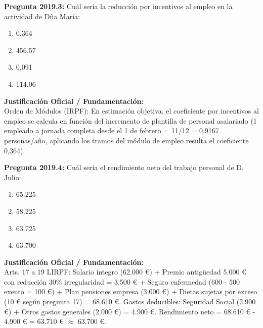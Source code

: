 \documentclass[11pt,a4paper,openany]{article}
\begin{document}
\noindent\textbf{\sffamily Pregunta 2019.3:} Cuál sería la reducción por incentivos al empleo en la actividad de Dña María:\\[0.15cm]
\begin{enumerate}[label=\textbf{\alph*)},leftmargin=1.8em,itemsep=1.5pt,topsep=2pt,partopsep=0pt,parsep=0pt]
    \item 0,364
    \item 456,57
    \item 0,091
    \item 114,06
\end{enumerate}
\begin{solucionBox}
\textbf{Justificación Oficial / Fundamentación:}\\[0.1cm]
Orden de Módulos (IRPF): En estimación objetiva, el coeficiente por incentivos al empleo se calcula en función del incremento de plantilla de personal asalariado (1 empleado a jornada completa desde el 1 de febrero = 11/12 = 0,9167 personas/año, aplicando los tramos del módulo de empleo resulta el coeficiente 0,364).
\end{solucionBox}
\vspace{0.35cm}

\noindent\textbf{\sffamily Pregunta 2019.4:} Cuál sería el rendimiento neto del trabajo personal de D. Julio:\\[0.15cm]
\begin{enumerate}[label=\textbf{\alph*)},leftmargin=1.8em,itemsep=1.5pt,topsep=2pt,partopsep=0pt,parsep=0pt]
    \item 65.225
    \item 58.225
    \item 63.725
    \item 63.700
\end{enumerate}
\begin{solucionBox}
\textbf{Justificación Oficial / Fundamentación:}\\[0.1cm]
Arts. 17 a 19 LIRPF: Salario íntegro (62.000 \euro{}) + Premio antigüedad 5.000 \euro{} con reducción 30\% irregularidad = 3.500 \euro{} + Seguro enfermedad (600 - 500 exento = 100 \euro{}) + Plan pensiones empresa (3.000 \euro{}) + Dietas sujetas por exceso (10 \euro{} según pregunta 17) = 68.610 \euro{}. Gastos deducibles: Seguridad Social (2.900 \euro{}) + Otros gastos generales (2.000 \euro{}) = 4.900 \euro{}. Rendimiento neto = 68.610 \euro{} - 4.900 \euro{} = 63.710 \euro{} $\approx$  63.700 \euro{}.
\end{solucionBox}
\vspace{0.35cm}
\end{document}
